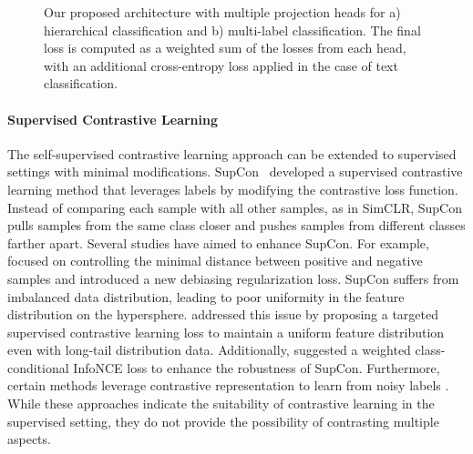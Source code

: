 \begin{figure*}
\hfill
{}
\caption{
Our proposed architecture with multiple projection heads for a) hierarchical classification and b) multi-label classification. 
The final loss is computed as a weighted sum of the losses from each head, with an additional cross-entropy loss applied in the case of text classification.
}
\end{figure*}

\paragraph{Supervised Contrastive Learning}
The self-supervised contrastive learning approach can be extended to supervised settings with minimal modifications. SupCon~\citep{khosla2020supervised} developed a supervised contrastive learning method that leverages labels by modifying the contrastive loss function. Instead of comparing each sample with all other samples, as in SimCLR, SupCon pulls samples from the same class closer and pushes samples from different classes farther apart. Several studies have aimed to enhance SupCon. For example, \citet{barbano2022unbiased} focused on controlling the minimal distance between positive and negative samples and introduced a new debiasing regularization loss. SupCon suffers from imbalanced data distribution, leading to poor uniformity in the feature distribution on the hypersphere. \citet{li2022targeted} addressed this issue by proposing a targeted supervised contrastive learning loss to maintain a uniform feature distribution even with long-tail distribution data. Additionally, \citet{chen2022perfectly} suggested a weighted class-conditional InfoNCE loss to enhance the robustness of SupCon. Furthermore, certain methods leverage contrastive representation to learn from noisy labels \citep{ciortan2021framework, ghosh2021contrastive, li2021learning, li2020mopro, xue2022investigating, yi2022learning}.  While these approaches indicate the suitability of contrastive learning in the supervised setting, they do not provide the possibility of contrasting multiple aspects.


